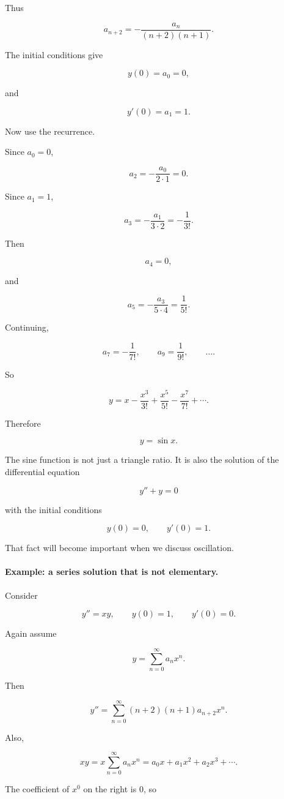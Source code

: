 Thus

\[
\boxed{
a_{n+2}=-\frac{a_n}{(n+2)(n+1)}.
}
\]

The initial conditions give

\[
y(0)=a_0=0,
\]

and

\[
y'(0)=a_1=1.
\]

Now use the recurrence.

Since \(a_0=0\),

\[
a_2=-\frac{a_0}{2\cdot1}=0.
\]

Since \(a_1=1\),

\[
a_3=-\frac{a_1}{3\cdot2}=-\frac1{3!}.
\]

Then

\[
a_4=0,
\]

and

\[
a_5=-\frac{a_3}{5\cdot4}
=
\frac1{5!}.
\]

Continuing,

\[
a_7=-\frac1{7!},
\qquad
a_9=\frac1{9!},
\qquad\ldots.
\]

So

\[
y=x-\frac{x^3}{3!}+\frac{x^5}{5!}-\frac{x^7}{7!}+\cdots.
\]

Therefore

\[
\boxed{
y=\sin x.
}
\]

The sine function is not just a triangle ratio.  It is also the solution of the differential
equation

\[
y''+y=0
\]

with the initial conditions

\[
y(0)=0,
\qquad
y'(0)=1.
\]

That fact will become important when we discuss oscillation.

\paragraph{Example: a series solution that is not elementary.}
Consider

\[
y''=xy,
\qquad
y(0)=1,
\qquad
y'(0)=0.
\]

Again assume

\[
y=\sum_{n=0}^{\infty}a_nx^n.
\]

Then

\[
y''=
\sum_{n=0}^{\infty}
(n+2)(n+1)a_{n+2}x^n.
\]

Also,

\[
xy=x\sum_{n=0}^{\infty}a_nx^n
=
a_0x+a_1x^2+a_2x^3+\cdots.
\]

The coefficient of \(x^0\) on the right is \(0\), so


